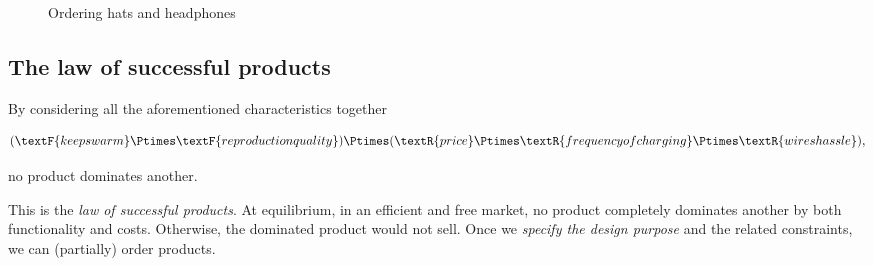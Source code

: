 \begin{figure}[h]
    \caption{Ordering hats and headphones}
\end{figure}



\subsection{The law of successful products}
By considering all the aforementioned characteristics together
\begin{widepar}
    \begin{equation}\label{eq:all-functionality}
        (\textF{keeps warm}\Ptimes \textF{reproduction quality})
        \Ptimes (\textR{price}\Ptimes \textR{frequency of charging}\Ptimes \textR{wires hassle}),
    \end{equation}
\end{widepar}
no product dominates another.

This is the \emph{law of successful products}.
At equilibrium, in an efficient and free market, no product completely dominates another by both functionality and costs.
Otherwise, the dominated product would not sell.
Once we \emph{specify the design purpose} and the related constraints, we can (partially) order products.

